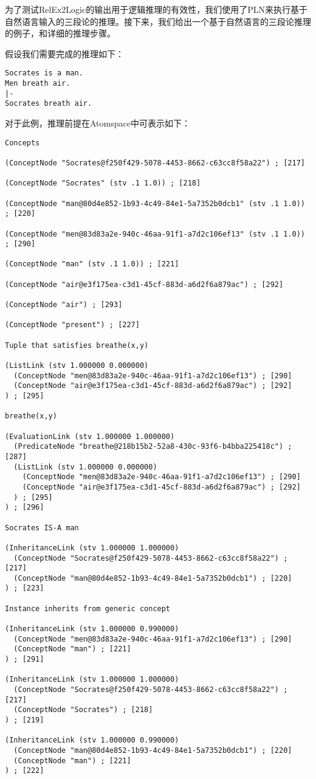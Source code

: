 为了测试RelEx2Logic的输出用于逻辑推理的有效性，我们使用了PLN来执行基于自然语言输入的三段论的推理。接下来，我们给出一个基于自然语言的三段论推理的例子，和详细的推理步骤。


假设我们需要完成的推理如下：

\begin{verbatim}
Socrates is a man.
Men breath air.
|- 
Socrates breath air.
\end{verbatim}

对于此例，推理前提在Atomspace中可表示如下：

{\tt\begin{small}\begin{lstlisting}
Concepts

(ConceptNode "Socrates@f250f429-5078-4453-8662-c63cc8f58a22") ; [217]

(ConceptNode "Socrates" (stv .1 1.0)) ; [218]

(ConceptNode "man@80d4e852-1b93-4c49-84e1-5a7352b0dcb1" (stv .1 1.0)) ; [220]

(ConceptNode "men@83d83a2e-940c-46aa-91f1-a7d2c106ef13" (stv .1 1.0)) ; [290]

(ConceptNode "man" (stv .1 1.0)) ; [221]

(ConceptNode "air@e3f175ea-c3d1-45cf-883d-a6d2f6a879ac") ; [292]

(ConceptNode "air") ; [293]

(ConceptNode "present") ; [227]

Tuple that satisfies breathe(x,y)

(ListLink (stv 1.000000 0.000000)
  (ConceptNode "men@83d83a2e-940c-46aa-91f1-a7d2c106ef13") ; [290]
  (ConceptNode "air@e3f175ea-c3d1-45cf-883d-a6d2f6a879ac") ; [292]
) ; [295]

breathe(x,y)

(EvaluationLink (stv 1.000000 1.000000)
  (PredicateNode "breathe@218b15b2-52a8-430c-93f6-b4bba225418c") ; [287]
  (ListLink (stv 1.000000 0.000000)
    (ConceptNode "men@83d83a2e-940c-46aa-91f1-a7d2c106ef13") ; [290]
    (ConceptNode "air@e3f175ea-c3d1-45cf-883d-a6d2f6a879ac") ; [292]
  ) ; [295]
) ; [296]

Socrates IS-A man

(InheritanceLink (stv 1.000000 1.000000)
  (ConceptNode "Socrates@f250f429-5078-4453-8662-c63cc8f58a22") ; [217]
  (ConceptNode "man@80d4e852-1b93-4c49-84e1-5a7352b0dcb1") ; [220]
) ; [223]

Instance inherits from generic concept

(InheritanceLink (stv 1.000000 0.990000)
  (ConceptNode "men@83d83a2e-940c-46aa-91f1-a7d2c106ef13") ; [290]
  (ConceptNode "man") ; [221]
) ; [291]

(InheritanceLink (stv 1.000000 1.000000)
  (ConceptNode "Socrates@f250f429-5078-4453-8662-c63cc8f58a22") ; [217]
  (ConceptNode "Socrates") ; [218]
) ; [219]

(InheritanceLink (stv 1.000000 0.990000)
  (ConceptNode "man@80d4e852-1b93-4c49-84e1-5a7352b0dcb1") ; [220]
  (ConceptNode "man") ; [221]
) ; [222]
 \end{lstlisting}\end{small}}
 

